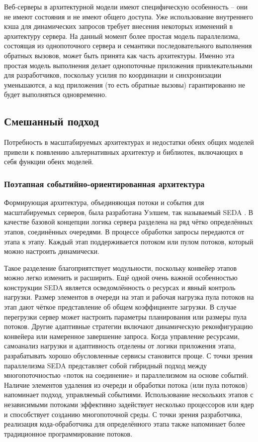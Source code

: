 Веб-серверы в архитектурной модели имеют специфическую особенность -- они не имеют состояния и не имеют общего доступа. Уже использование внутреннего кэша для динамических запросов требует внесения некоторых изменений в архитектуру сервера. На данный момент более простая модель параллелизма, состоящая из однопоточного сервера и семантики последовательного выполнения обратных вызовов, может быть принята как часть архитектуры. Именно эта простая модель выполнения делает однопоточные приложения привлекательными для разработчиков, поскольку усилия по координации и синхронизации уменьшаются, а код приложения (то есть обратные вызовы) гарантированно не будет выполняться одновременно.

\subsection{Смешанный подход}

Потребность в масштабируемых архитектурах и недостатки обеих общих моделей привели к появлению альтернативных архитектур и библиотек, включающих в себя функции обеих моделей.

\subsubsection{Поэтапная событийно-ориентированная архитектура}

Формирующая архитектура, объединяющая потоки и события для масштабируемых серверов, была разработана Уэлшем, так называемый SEDA \cite{seda}. В качестве базовой концепции логика сервера разделена на ряд чётко определённых этапов, соединённых очередями. В процессе обработки запросы передаются от этапа к этапу. Каждый этап поддерживается потоком или пулом потоков, который можно настроить динамически.

Такое разделение благоприятствует модульности, поскольку конвейер этапов можно легко изменить и расширить. Ещё одной очень важной особенностью конструкции SEDA является осведомлённость о ресурсах и явный контроль нагрузки. Размер элементов в очереди на этап и рабочая нагрузка пула потоков на этап дают чёткое представление об общем коэффициенте загрузки. В случае перегрузки сервер может настроить параметры планирования или размеры пула потоков. Другие адаптивные стратегии включают динамическую реконфигурацию конвейера или намеренное завершение запроса. Когда управление ресурсами, самоанализ нагрузки и адаптивность отделены от логики приложения этапа, разрабатывать хорошо обусловленные сервисы становится проще. С точки зрения параллелизма SEDA представляет собой гибридный подход между многопоточностью «поток на соединение» и параллелизмом на основе событий. Наличие элементов удаления из очереди и обработки потока (или пула потоков) напоминает подход, управляемый событиями. Использование нескольких этапов с независимыми потоками эффективно задействует несколько процессоров или ядер и способствует созданию многопоточной среды. С точки зрения разработчика, реализация кода-обработчика для определённого этапа также напоминает более традиционное программирование потоков.

